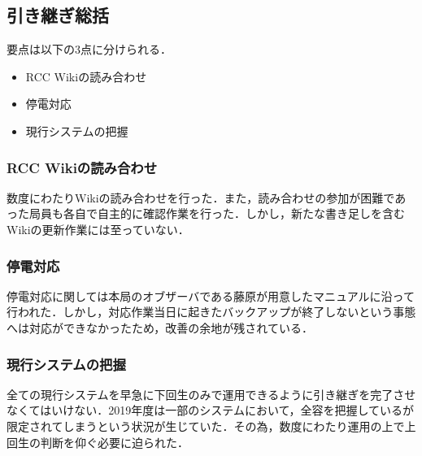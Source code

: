 \subsection*{引き継ぎ総括}


要点は以下の3点に分けられる．
 \begin{itemize}
\item RCC Wikiの読み合わせ
\item 停電対応
\item 現行システムの把握
 \end{itemize}
\subsubsection* {RCC Wikiの読み合わせ}
数度にわたりWikiの読み合わせを行った．また，読み合わせの参加が困難であった局員も各自で自主的に確認作業を行った．しかし，新たな書き足しを含むWikiの更新作業には至っていない．
\subsubsection* {停電対応}
停電対応に関しては本局のオブザーバである藤原が用意したマニュアルに沿って行われた．しかし，対応作業当日に起きたバックアップが終了しないという事態へは対応ができなかったため，改善の余地が残されている．
\subsubsection* {現行システムの把握}
全ての現行システムを早急に下回生のみで運用できるように引き継ぎを完了させなくてはいけない．2019年度は一部のシステムにおいて，全容を把握している\systemStaff{}が限定されてしまうという状況が生じていた．その為，数度にわたり運用の上で上回生の判断を仰ぐ必要に迫られた．
